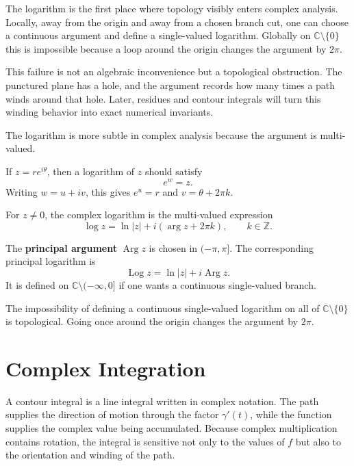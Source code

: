 The logarithm is the first place where topology visibly enters complex analysis. Locally, away from the origin and away from a chosen branch cut, one can choose a continuous argument and define a single-valued logarithm. Globally on $\mathbb{C}\setminus\{0\}$ this is impossible because a loop around the origin changes the argument by $2\pi$.

This failure is not an algebraic inconvenience but a topological obstruction. The punctured plane has a hole, and the argument records how many times a path winds around that hole. Later, residues and contour integrals will turn this winding behavior into exact numerical invariants.

The logarithm is more subtle in complex analysis because the argument is multi-valued.

If $z=re^{i\theta}$, then a logarithm of $z$ should satisfy
\[
    e^w=z.
\]
Writing $w=u+iv$, this gives $e^u=r$ and $v=\theta+2\pi k$.

\begin{definition}
For $z\neq 0$, the complex logarithm is the multi-valued expression
\[
    \log z=\ln|z|+i(\arg z+2\pi k),\qquad k\in\mathbb{Z}.
\]
\end{definition}

\begin{definition}
The \textbf{principal argument} $\operatorname{Arg}z$ is chosen in $(-\pi,\pi]$. The corresponding principal logarithm is
\[
    \operatorname{Log}z=\ln|z|+i\operatorname{Arg}z.
\]
It is defined on $\mathbb{C}\setminus(-\infty,0]$ if one wants a continuous single-valued branch.
\end{definition}

\begin{remark}
The impossibility of defining a continuous single-valued logarithm on all of $\mathbb{C}\setminus\{0\}$ is topological. Going once around the origin changes the argument by $2\pi$.
\end{remark}

\section{Complex Integration}


A contour integral is a line integral written in complex notation. The path supplies the direction of motion through the factor $\gamma'(t)$, while the function supplies the complex value being accumulated. Because complex multiplication contains rotation, the integral is sensitive not only to the values of $f$ but also to the orientation and winding of the path.

